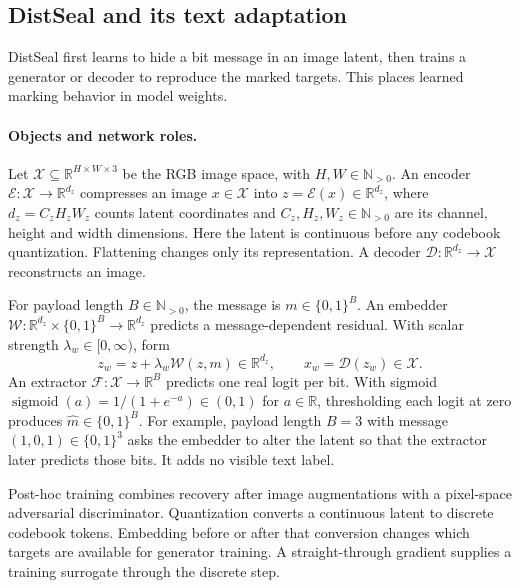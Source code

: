 \subsection{DistSeal and its text adaptation}
\label{app:distseal}
DistSeal \citep{distseal} first learns to hide a bit message in an image latent, then trains a generator or decoder to reproduce the marked targets. This places learned marking behavior in model weights.

\paragraph{Objects and network roles.}
Let $\mathcal X\subseteq\mathbb R^{H\times W\times3}$ be the RGB image space, with $H,W\in\mathbb N_{>0}$. An encoder $\mathcal E:\mathcal X\to\mathbb R^{d_z}$ compresses an image $x\in\mathcal X$ into $z=\mathcal E(x)\in\mathbb R^{d_z}$, where $d_z=C_zH_zW_z$ counts latent coordinates and $C_z,H_z,W_z\in\mathbb N_{>0}$ are its channel, height and width dimensions. Here the latent is continuous before any codebook quantization. Flattening changes only its representation. A decoder $\mathcal D:\mathbb R^{d_z}\to\mathcal X$ reconstructs an image.

For payload length $B\in\mathbb N_{>0}$, the message is $m\in\{0,1\}^B$. An embedder $\mathcal W:\mathbb R^{d_z}\times\{0,1\}^B\to\mathbb R^{d_z}$ predicts a message-dependent residual. With scalar strength $\lambda_w\in[0,\infty)$, form
\begin{equation}
\label{eq:distseal-image-objective}
 z_w=z+\lambda_w\mathcal W(z,m)\in\mathbb R^{d_z},
 \qquad x_w=\mathcal D(z_w)\in\mathcal X.
\end{equation}
An extractor $\mathcal F:\mathcal X\to\mathbb R^B$ predicts one real logit per bit. With sigmoid $\operatorname{sigmoid}(a)=1/(1+e^{-a})\in(0,1)$ for $a\in\mathbb R$, thresholding each logit at zero produces $\widehat m\in\{0,1\}^B$. For example, payload length $B=3$ with message $(1,0,1)\in\{0,1\}^3$ asks the embedder to alter the latent so that the extractor later predicts those bits. It adds no visible text label.

Post-hoc training combines recovery after image augmentations with a pixel-space adversarial discriminator. Quantization converts a continuous latent to discrete codebook tokens. Embedding before or after that conversion changes which targets are available for generator training. A straight-through gradient supplies a training surrogate through the discrete step.

